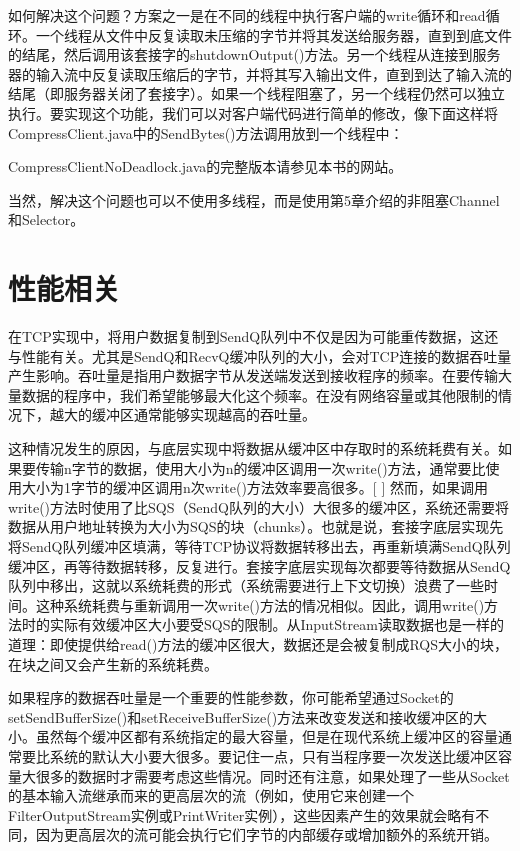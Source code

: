 	

	如何解决这个问题？方案之一是在不同的线程中执行客户端的write循环和read循环。一个线程从文件中反复读取未压缩的字节并将其发送给服务器，直到到底文件的结尾，然后调用该套接字的shutdownOutput()方法。另一个线程从连接到服务器的输入流中反复读取压缩后的字节，并将其写入输出文件，直到到达了输入流的结尾（即服务器关闭了套接字）。如果一个线程阻塞了，另一个线程仍然可以独立执行。要实现这个功能，我们可以对客户端代码进行简单的修改，像下面这样将CompressClient.java中的SendBytes()方法调用放到一个线程中：

	

	CompressClientNoDeadlock.java的完整版本请参见本书的网站。

	

	当然，解决这个问题也可以不使用多线程，而是使用第5章介绍的非阻塞Channel和Selector。

\section{性能相关}

	在TCP实现中，将用户数据复制到SendQ队列中不仅是因为可能重传数据，这还与性能有关。尤其是SendQ和RecvQ缓冲队列的大小，会对TCP连接的数据吞吐量产生影响。吞吐量是指用户数据字节从发送端发送到接收程序的频率。在要传输大量数据的程序中，我们希望能够最大化这个频率。在没有网络容量或其他限制的情况下，越大的缓冲区通常能够实现越高的吞吐量。

	这种情况发生的原因，与底层实现中将数据从缓冲区中存取时的系统耗费有关。如果要传输n字节的数据，使用大小为n的缓冲区调用一次write()方法，通常要比使用大小为1字节的缓冲区调用n次write()方法效率要高很多。[ ] 然而，如果调用write()方法时使用了比SQS（SendQ队列的大小）大很多的缓冲区，系统还需要将数据从用户地址转换为大小为SQS的块（chunks）。也就是说，套接字底层实现先将SendQ队列缓冲区填满，等待TCP协议将数据转移出去，再重新填满SendQ队列缓冲区，再等待数据转移，反复进行。套接字底层实现每次都要等待数据从SendQ队列中移出，这就以系统耗费的形式（系统需要进行上下文切换）浪费了一些时间。这种系统耗费与重新调用一次write()方法的情况相似。因此，调用write()方法时的实际有效缓冲区大小要受SQS的限制。从InputStream读取数据也是一样的道理：即使提供给read()方法的缓冲区很大，数据还是会被复制成RQS大小的块，在块之间又会产生新的系统耗费。

	如果程序的数据吞吐量是一个重要的性能参数，你可能希望通过Socket的setSendBufferSize()和setReceiveBufferSize()方法来改变发送和接收缓冲区的大小。虽然每个缓冲区都有系统指定的最大容量，但是在现代系统上缓冲区的容量通常要比系统的默认大小要大很多。要记住一点，只有当程序要一次发送比缓冲区容量大很多的数据时才需要考虑这些情况。同时还有注意，如果处理了一些从Socket的基本输入流继承而来的更高层次的流（例如，使用它来创建一个FilterOutputStream实例或PrintWriter实例），这些因素产生的效果就会略有不同，因为更高层次的流可能会执行它们字节的内部缓存或增加额外的系统开销。


